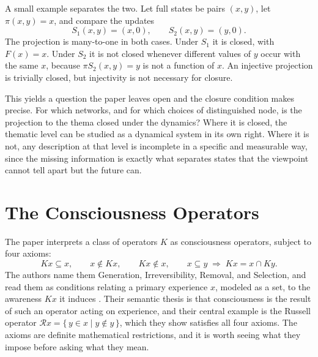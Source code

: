 \documentclass[11pt, a4paper]{article}
\theoremstyle{plain}
\theoremstyle{definition}
\theoremstyle{remark}
\begin{document}
A small example separates the two. Let full states be pairs $(x,y)$, let $\pi(x,y) = x$, and compare the updates
\[
S_1(x,y) = (x,0), \qquad S_2(x,y) = (y,0).
\]
The projection is many-to-one in both cases. Under $S_1$ it is closed, with $F(x) = x$. Under $S_2$ it is not closed whenever different values of $y$ occur with the same $x$, because $\pi S_2(x,y) = y$ is not a function of $x$. An injective projection is trivially closed, but injectivity is not necessary for closure.

This yields a question the paper leaves open and the closure condition makes precise. For which networks, and for which choices of distinguished node, is the projection to the thema closed under the dynamics? Where it is closed, the thematic level can be studied as a dynamical system in its own right. Where it is not, any description at that level is incomplete in a specific and measurable way, since the missing information is exactly what separates states that the viewpoint cannot tell apart but the future can.

\section{The Consciousness Operators}

The paper interprets a class of operators $K$ as consciousness operators, subject to four axioms:
\[
Kx \subseteq x, \qquad x \notin Kx, \qquad Kx \notin x, \qquad x \subseteq y \;\Longrightarrow\; Kx = x \cap Ky.
\]
The authors name them Generation, Irreversibility, Removal, and Selection, and read them as conditions relating a primary experience $x$, modeled as a set, to the awareness $Kx$ it induces \cite{mz2009}. Their semantic thesis is that consciousness is the result of such an operator acting on experience, and their central example is the Russell operator $\mathcal{R}x = \{\, y \in x \mid y \notin y \,\}$, which they show satisfies all four axioms. The axioms are definite mathematical restrictions, and it is worth seeing what they impose before asking what they mean.
\end{document}
